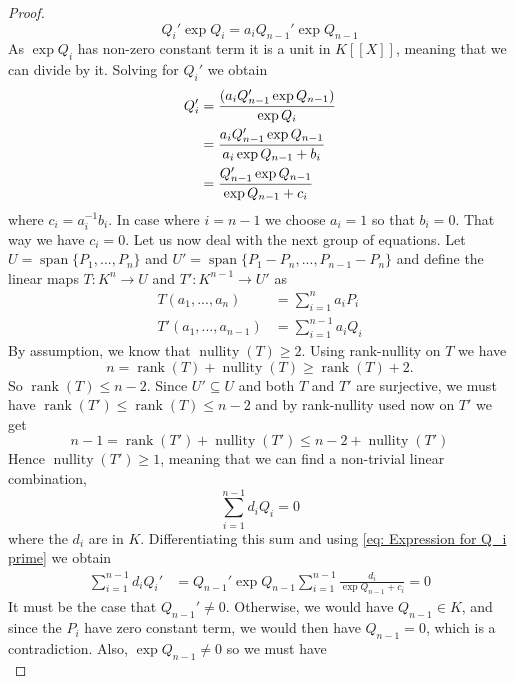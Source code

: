 \documentclass{article}
\DeclareMathOperator{\rank}{rank}
\DeclareMathOperator{\nullity}{nullity}
\newcommand{\Span}{\operatorname{span}}
\numberwithin{equation}{section}
\begin{document}
\begin{proof}
    $$Q_i' \exp Q_i = a_i Q_{n-1}' \exp Q_{n-1}$$
    As $\exp Q_i$ has non-zero constant term it is a unit in $K[[X]]$, meaning that we can divide by it. Solving for $Q_i'$ we obtain
    \begin{align}\label{eq: Expression for Q_i prime}
        Q_i' & = \frac{(a_i Q_{n-1}' \exp Q_{n-1})}{\exp Q_i} \notag      \\
             & = \frac{a_i Q_{n-1}' \exp Q_{n-1}}{a_i \exp Q_{n-1} + b_i} \\
             & = \frac{Q_{n-1}' \exp Q_{n-1}}{\exp Q_{n-1} + c_i} \notag
    \end{align}
    where $c_i = a_i^{-1}b_i$. In case where $i = n-1$ we choose $a_{i} = 1$ so that $b_{i} = 0$. That way we have $c_i = 0$. Let us now deal with the next group of equations. Let $U = \Span \{P_1, ..., P_n \}$ and $U' = \Span \{P_1 - P_n, ..., P_{n-1} - P_n \}$ and define the linear maps $T : K^n \to U$ and $T' : K^{n-1} \to U'$ as
    \begin{align*}
        T(a_1, ..., a_n)      & = \sum_{i=1}^n a_i P_i     \\
        T'(a_1, ..., a_{n-1}) & = \sum_{i=1}^{n-1} a_i Q_i
    \end{align*}
    By assumption, we know that $\nullity(T) \geq 2$. Using rank-nullity on $T$ we have
    $$n = \rank(T) + \nullity(T) \geq \rank(T) + 2.$$
    So $\rank(T) \leq n-2$. Since $U' \subseteq U$ and both $T$ and $T'$ are surjective, we must have $\rank(T') \leq \rank(T) \leq n-2$ and by rank-nullity used now on $T'$ we get
    $$n-1 = \rank(T') + \nullity(T') \leq n-2 + \nullity(T')$$
    Hence $\nullity(T') \geq 1$, meaning that we can find a non-trivial linear combination,
    \begin{equation}\label{eq: Non trivial Q_i linear combination}
        \sum_{i=1}^{n-1} d_i Q_i = 0
    \end{equation}
    where the $d_i$ are in $K$. Differentiating this sum and using \cref{eq: Expression for Q_i prime} we obtain
    \begin{align*}
        \sum_{i=1}^{n-1} d_i Q_i' & = Q_{n-1}' \exp Q_{n-1} \sum_{i=1}^{n-1} \frac{d_i}{\exp Q_{n-1} + c_i} = 0
    \end{align*}
    It must be the case that $Q_{n-1}' \neq 0$. Otherwise, we would have $Q_{n-1} \in K$, and since the $P_i$ have zero constant term, we would then have $Q_{n-1} = 0$, which is a contradiction. Also, $\exp Q_{n-1} \neq 0$ so we must have
    \begin{equation}\label{eq: Zero equation}

\end{equation}
\end{proof}
\end{document}

